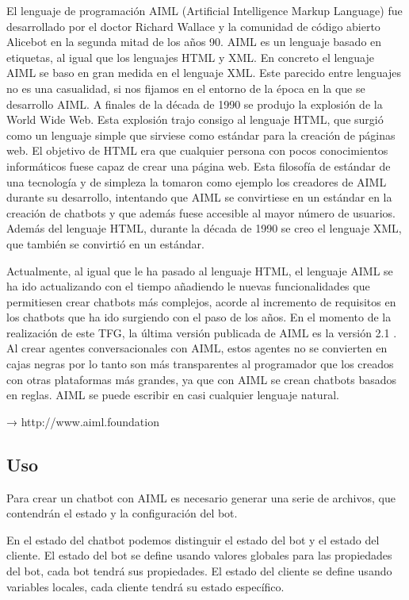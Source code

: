 El lenguaje de programación AIML (Artificial Intelligence Markup Language) fue desarrollado por el doctor Richard Wallace y la comunidad de código abierto Alicebot en la segunda mitad de los años 90. AIML es un lenguaje basado en etiquetas, al igual que los lenguajes HTML y XML. En concreto el lenguaje AIML se baso en gran medida en el lenguaje XML. Este parecido entre lenguajes no es una casualidad, si nos fijamos en el entorno de la época en la que se desarrollo AIML. A finales de la década de 1990 se produjo la explosión de la World Wide Web. Esta explosión trajo consigo al lenguaje HTML, que surgió como un lenguaje simple que sirviese como estándar para la creación de páginas web. El objetivo de HTML era que cualquier persona con pocos conocimientos informáticos fuese capaz de crear una página web. Esta filosofía de estándar de una tecnología y de simpleza la tomaron como ejemplo los creadores de AIML durante su desarrollo, intentando que AIML se convirtiese en un estándar en la creación de chatbots y que además fuese accesible al mayor número de usuarios. Además del lenguaje HTML, durante la década de 1990 se creo el lenguaje XML, que también se convirtió en un estándar.

Actualmente, al igual que le ha pasado al lenguaje HTML, el lenguaje AIML se ha ido actualizando con el tiempo añadiendo le nuevas funcionalidades que permitiesen crear chatbots más complejos, acorde al incremento de requisitos en los chatbots que ha ido surgiendo con el paso de los años. En el momento de la realización de este TFG, la última versión publicada de AIML es la versión 2.1 . Al crear agentes conversacionales con AIML, estos agentes no se convierten en cajas negras por lo tanto son más transparentes al programador que los creados con otras plataformas más grandes, ya que con AIML se crean chatbots basados en reglas. AIML se puede escribir en casi cualquier lenguaje natural.





→ http://www.aiml.foundation

\subsection*{Uso}

Para crear un chatbot con AIML es necesario generar una serie de archivos, que contendrán el estado y la configuración del bot.

En el estado del chatbot podemos distinguir el estado del bot y el estado del cliente. El estado del bot se define usando valores globales para las propiedades del bot, cada bot tendrá sus propiedades. El estado del cliente se define usando variables locales, cada cliente tendrá su estado específico.


